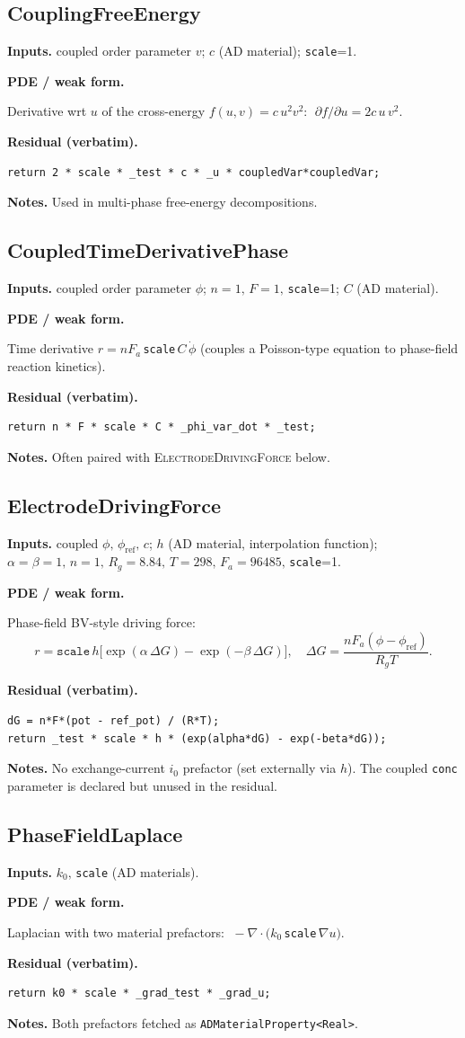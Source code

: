 \documentclass[11pt]{article}
\newcommand{\F}{F_{\!a}}            %
\newcommand{\Rg}{R_{\!g}}           %
\newenvironment{ecmEntry}[1]{%
  \subsection{#1}%
}{}
\newcommand{\inputsRow}[1]{\par\noindent\textbf{Inputs.} #1\par}
\newcommand{\pdeRow}[1]{\par\noindent\textbf{PDE / weak form.}\par #1\par}
\newcommand{\codeRow}{\par\noindent\textbf{Residual (verbatim).}\par}
\newcommand{\notesRow}[1]{\par\noindent\textbf{Notes.} #1\par}
\begin{document}
\begin{ecmEntry}{CouplingFreeEnergy}
\inputsRow{coupled order parameter $v$; $c$ (AD material); \texttt{scale}=1.}
\pdeRow{Derivative wrt $u$ of the cross-energy $f(u,v)=c\,u^2 v^2$:
$\;\partial f/\partial u = 2 c\,u\,v^2$.}
\codeRow\begin{lstlisting}
return 2 * scale * _test * c * _u * coupledVar*coupledVar;
\end{lstlisting}
\notesRow{Used in multi-phase free-energy decompositions.}
\end{ecmEntry}

\begin{ecmEntry}{CoupledTimeDerivativePhase}
\inputsRow{coupled order parameter $\phi$; $n=1,\,F=1,\,$\texttt{scale}=1; $C$ (AD material).}
\pdeRow{Time derivative $r = n\F\,$\texttt{scale}$\,C\,\dot{\phi}$ (couples a Poisson-type
equation to phase-field reaction kinetics).}
\codeRow\begin{lstlisting}
return n * F * scale * C * _phi_var_dot * _test;
\end{lstlisting}
\notesRow{Often paired with \textsc{ElectrodeDrivingForce} below.}
\end{ecmEntry}

\begin{ecmEntry}{ElectrodeDrivingForce}
\inputsRow{coupled $\phi,\,\phi_{\text{ref}},\,c$; $h$ (AD material, interpolation function);
$\alpha=\beta=1,\,n=1,\,\Rg=8.84,\,T=298,\,\F=96485,\,$\texttt{scale}=1.}
\pdeRow{Phase-field BV-style driving force:
\[
  r = \texttt{scale}\,h\bigl[\exp(\alpha\,\Delta G) - \exp(-\beta\,\Delta G)\bigr],\quad
  \Delta G = \frac{n\F(\phi-\phi_{\text{ref}})}{\Rg T}.
\]}
\codeRow\begin{lstlisting}
dG = n*F*(pot - ref_pot) / (R*T);
return _test * scale * h * (exp(alpha*dG) - exp(-beta*dG));
\end{lstlisting}
\notesRow{No exchange-current $i_0$ prefactor (set externally via $h$). The coupled
\texttt{conc} parameter is declared but unused in the residual.}
\end{ecmEntry}

\begin{ecmEntry}{PhaseFieldLaplace}
\inputsRow{$k_0,\,$\texttt{scale} (AD materials).}
\pdeRow{Laplacian with two material prefactors: $\;-\nabla\cdot(k_0\,$\texttt{scale}$\,\nabla u)$.}
\codeRow\begin{lstlisting}
return k0 * scale * _grad_test * _grad_u;
\end{lstlisting}
\notesRow{Both prefactors fetched as \texttt{ADMaterialProperty<Real>}.}
\end{ecmEntry}
\end{document}
